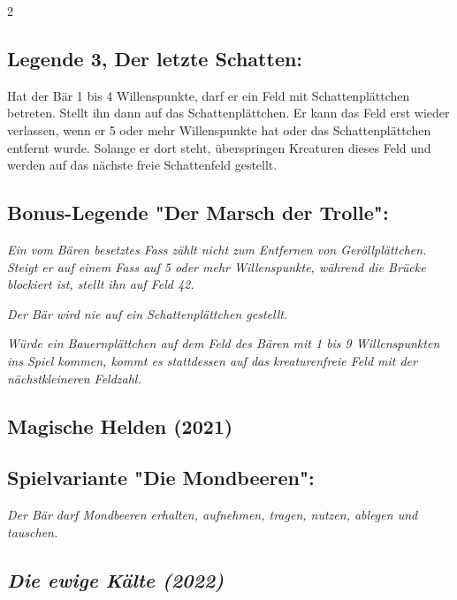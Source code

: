 \documentclass[10pt, a4paper, oneside]{book}
\newcommand{\fan}[1]{\textit{#1}}
\begin{document}
\begin{multicols*}{2}
\begin{bgcolor}[color-DZ]
\subsection{Legende 3, Der letzte Schatten:}

Hat der Bär 1 bis 4 Willenspunkte, darf er ein Feld mit Schattenplättchen betreten. Stellt ihn dann auf das Schattenplättchen. Er kann das Feld erst wieder verlassen, wenn er 5 oder mehr Willenspunkte hat oder das Schattenplättchen entfernt wurde. Solange er dort steht, überspringen Kreaturen dieses Feld und werden auf das nächste freie Schattenfeld gestellt.
\supercite{DZ:Begleitheft}


\subsection{Bonus-Legende "Der Marsch der Trolle":}

\fan{Ein vom Bären besetztes Fass zählt nicht zum Entfernen von Geröllplättchen. Steigt er auf einem Fass auf 5 oder mehr Willenspunkte, während die Brücke blockiert ist, stellt ihn auf Feld 42.}

\fan{Der Bär wird nie auf ein Schattenplättchen gestellt.}

\fan{Würde ein Bauernplättchen auf dem Feld des Bären mit 1 bis 9 Willenspunkten ins Spiel kommen, kommt es stattdessen auf das kreaturenfreie Feld mit der nächstkleineren Feldzahl.}

\end{bgcolor}


\columnbreak

\begin{nobgcolor}

\section{Magische Helden (2021)}

\subsection{Spielvariante "Die Mondbeeren":}

\fan{Der Bär darf Mondbeeren erhalten, aufnehmen, tragen, nutzen, ablegen und tauschen.}


\end{nobgcolor}




\begin{bgcolor}
\section{\fan{Die ewige Kälte (2022)}}


\end{bgcolor}
\end{multicols*}
\end{document}
